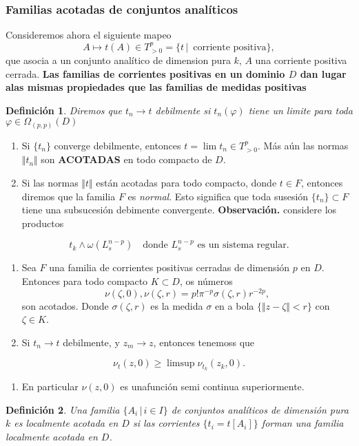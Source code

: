 \documentclass[letterpaper]{article}
\newtheorem{def.}{Definici\'on}[section]
\newcommand{\obs}{{\noindent \sc \textbf{Observación. }}}
\newcommand{\om}{\ensuremath{\Omega}}
\begin{document}
\subsubsection{Familias acotadas de conjuntos analíticos}
\label{sec:orgd99d874}
Consideremos ahora el siguiente mapeo
\[
    A\mapsto t(A)\in T^p_{>0}=\{t\,|\,\text{ corriente positiva}\},
\]
\noindent que asocia a un conjunto analítico de dimension pura \(k\), \(A\) una corriente positiva cerrada.
\textbf{Las familias de corrientes positivas en un dominio \(D\) dan lugar alas mismas propiedades que las familias de medidas positivas}
\begin{def.}
Diremos que \(t_n\rightarrow t\) \emph{debilmente} si \(t_n(\varphi)\) tiene un limite para toda \(\varphi\in\om_(p,p)(D)\)
\end{def.}

\begin{enumerate}
\item Si \(\{t_n\}\) converge debilmente, entonces \(t=\lim t_{n}\in T^{p}_{>0}\). Más aún las normas \(\Vert t_n\Vert\) son \textbf{ACOTADAS} en todo compacto de \(D\).
\item Si las normas \(\Vert t\Vert\) están acotadas para todo compacto, donde \(t\in F\), entonces diremos que la familia \(F\) es \emph{normal}. Esto significa que toda susesión \(\{t_n\}\subset F\) tiene una subsucesión debimente convergente.
\obs considere los productos
\end{enumerate}
\[
    t_k\wedge\omega(L^{n-p}_s)\quad\text{donde }L^{n-p}_s\text{ es un sistema regular}.
\]
\begin{enumerate}
\item Sea \(F\) una familia de corrientes positivas cerradas de dimensión \(p\) en \(D\). Entonces para todo compacto \(K\subset D\), os números
\[
        \nu(\zeta,0),\nu(\zeta,r)=p!\pi^{-p}\sigma(\zeta,r)r^{-2p},
   \]
\noindent son acotados. Donde \(\sigma(\zeta,r)\) es la medida \(\sigma\) en a bola \(\{\Vert z-\zeta\Vert<r\}\) con \(\zeta\in K\).
\item Si \(t_n\rightarrow t\) debilmente, y \(z_m\rightarrow z\), entonces tenemoss que
\end{enumerate}
\begin{equation}
        \nu_t(z,0)\geq\limsup\nu_{t_k}(z_k,0).
\end{equation}
\begin{enumerate}
\item En particular \(\nu(z,0)\) es unafunción semi continua superiormente.
\end{enumerate}
\begin{def.}
Una familia \(\{A_i\,|\,i\in I\}\) de conjuntos analíticos de dimensión pura \(k\) es localmente acotada en \(D\) si las corrientes \(\{t_i=t[A_i]\}\) forman una familia localmente acotada en \(D\).
\end{def.}
\end{document}
